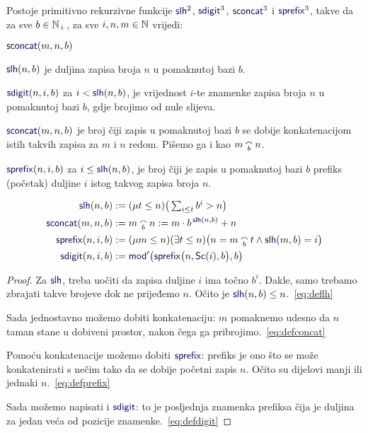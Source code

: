 \begin{lema}[{name=[rad sa zapisima u pomaknutoj bazi]}]\label{lm:ldcpprn}
Postoje primitivno rekurzivne funkcije $\f{slh}^2$\!, $\f{sdigit}^3$\!, $\f{sconcat}^3$ i $\f{sprefix}^3$, takve da za sve $b\in{\mathbb N}_+$, za sve $i,n,m\in{\mathbb N}$ vrijedi:
\begin{labeling}{$\f{sconcat}(m,n,b)$}
    \item[$\f{slh}(n,b)$] je duljina zapisa broja $n$ u pomaknutoj bazi $b$. \item[$\f{sdigit}(n,i,b)$] za $i<\f{slh}(n,b)$, je vrijednost $i$-te znamenke zapisa broja $n$ u pomaknutoj bazi $b$, gdje brojimo od nule slijeva.
    \item[$\f{sconcat}(m,n,b)$] je broj čiji zapis u pomaknutoj bazi $b$ se dobije konkatenacijom istih takvih zapisa za $m$ i $n$ redom. Pišemo ga i kao $m\conc bn$.
    \item[$\f{sprefix}(n,i,b)$] za $i\le\f{slh}(n,b)$, je broj čiji je zapis u pomaknutoj bazi $b$ prefiks (početak) duljine $i$ istog takvog zapisa broja $n$.
\end{labeling}
\end{lema}
\noindent\begin{align}
\label{eq:deflh}
    \f{slh}(n,b)&:=(\mu t\le n)\big(
    \textstyle\sum_{i\le t}b^i>n
    \big)\\
\label{eq:defconcat}
    \f{sconcat}(m,n,b)&:=m\conc bn:=m\cdot b^{\,\f{slh}(n,b)}+n\\
\label{eq:defprefix}
    \f{sprefix}(n,i,b)&:=(\mu m\le n)(\exists t\le n)\bigl(n=m\conc bt\land\f{slh}(m,b)=i\bigr)\\
\label{eq:defdigit}
    \f{sdigit}(n,i,b)&:=\f{mod}'\bigl(\f{sprefix}\bigl(n,\f{Sc}(i),b\bigr),b\bigr)
\end{align}
\begin{proof}
Za $\f{slh}$, treba uočiti da zapisa duljine $i$ ima točno $b^i$. Dakle, samo trebamo zbrajati takve brojeve dok ne prijeđemo $n$. Očito je $\f{slh}(n,b)\le n$.~\eqref{eq:deflh}

Sada jednostavno možemo dobiti konkatenaciju: $m$ pomaknemo udesno da $n$ taman stane u dobiveni prostor, nakon čega ga pribrojimo.~\eqref{eq:defconcat}

Pomoću konkatenacije možemo dobiti $\f{sprefix}$: prefiks je ono što se može konkatenirati s nečim tako da se dobije početni zapis $n$. Očito su dijelovi manji ili jednaki $n$.~\eqref{eq:defprefix} %

Sada možemo napisati i $\f{sdigit}$: to je posljednja znamenka prefiksa čija je duljina za jedan veća od pozicije znamenke.~\eqref{eq:defdigit}
\end{proof}

